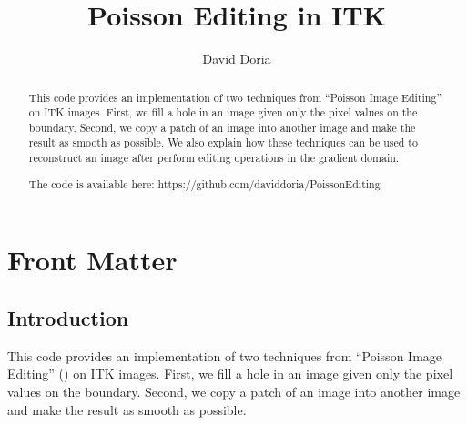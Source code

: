 \documentclass{InsightArticle}
\title{Poisson Editing in ITK}
\author{David Doria}
\newcommand{\IJhandlerIDnumber}{3257}
\begin{document}
%
% 
\IJhandlefooter{\IJhandlerIDnumber}


\ifpdf
\else
\fi


\maketitle


\ifhtml
\chapter*{Front Matter\label{front}}
\fi


\begin{abstract}
\noindent
This code provides an implementation of two techniques from ``Poisson Image Editing'' on ITK images. First, we fill a hole in an image given only the pixel values on the boundary. Second, we copy a patch of an image into another image and make the result as smooth as possible. We also explain how these techniques can be used to reconstruct an image after perform editing operations in the gradient domain.

The code is available here: https://github.com/daviddoria/PoissonEditing

\end{abstract}

\IJhandlenote{\IJhandlerIDnumber}

\tableofcontents

\section{Introduction}
This code provides an implementation of two techniques from ``Poisson Image Editing'' (\cite{PoissonImageEditing}) on ITK images. First, we fill a hole in an image given only the pixel values on the boundary. Second, we copy a patch of an image into another image and make the result as smooth as possible. 
\end{document}
